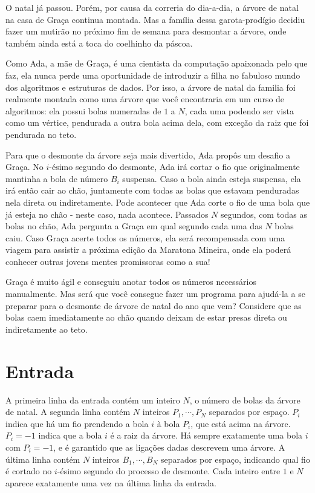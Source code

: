 O natal já passou. Porém, por causa da correria do dia-a-dia, a árvore de natal na casa de Graça continua montada.
Mas a família dessa garota-prodígio decidiu fazer um mutirão no próximo fim de semana para desmontar a árvore,
onde também ainda está a toca do coelhinho da páscoa.

Como Ada, a mãe de Graça, é uma cientista da computação apaixonada pelo que faz,
ela nunca perde uma oportunidade de introduzir a filha
no fabuloso mundo dos algoritmos e estruturas de dados.
Por isso, a árvore de natal da familia foi realmente montada como uma árvore
que você encontraria em um curso de algoritmos: ela possui bolas numeradas de $1$ a $N$, cada uma
podendo ser vista como um vértice, pendurada a outra bola acima dela,
com exceção da raiz que foi pendurada no teto.

Para que o desmonte da árvore seja mais divertido, Ada propôs um desafio a Graça.
No $i$-ésimo segundo do desmonte, Ada irá cortar o fio que originalmente mantinha a bola de número $B_i$ suspensa.
Caso a bola ainda esteja suspensa, ela irá então cair ao chão, juntamente com todas as bolas que estavam
penduradas nela direta ou indiretamente.
Pode acontecer que Ada corte o fio de uma bola que já esteja no chão - neste caso, nada acontece.
Passados $N$ segundos, com todas as bolas no chão, Ada pergunta a Graça em qual segundo cada uma das $N$
bolas caiu.
Caso Graça acerte todos os números, ela será recompensada com uma viagem para assistir a próxima
edição da Maratona Mineira, onde ela poderá conhecer outras jovens mentes promissoras como a sua!

Graça é muito ágil e conseguiu anotar todos os números necessários manualmente. Mas será que você
consegue fazer um programa para ajudá-la a se preparar para o desmonte de árvore de natal do ano que vem?
Considere que as bolas caem imediatamente ao chão quando deixam de estar presas direta ou indiretamente ao teto.

\section*{Entrada}

A primeira linha da entrada contém um inteiro $N$, o número de bolas da árvore de natal.
A segunda linha contém $N$ inteiros $P_1, \cdots, P_N$ separados por espaço.
$P_i$ indica que há um fio prendendo a bola $i$ à bola $P_i$, que está acima na árvore.
$P_i = -1$ indica que a bola $i$ é a raiz da árvore.
Há sempre exatamente uma bola $i$ com 
$P_i = -1$, e é garantido que as ligações dadas descrevem uma árvore.
A última linha contém $N$ inteiros $B_1, \cdots, B_N$ separados por espaço, indicando qual fio é
cortado no $i$-ésimo segundo do processo de desmonte.
Cada inteiro entre $1$ e $N$ aparece exatamente uma vez na última linha da entrada.

